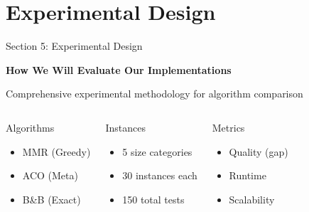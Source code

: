 \documentclass[aspectratio=43,8pt]{beamer}
\begin{document}
\section{Experimental Design}

\begin{frame}{Section 5: Experimental Design}
\begin{center}
{\Large\textcolor{primaryblue}{\textbf{How We Will Evaluate Our Implementations}}}

\vspace{0.5cm}
{\normalsize Comprehensive experimental methodology for algorithm comparison}
\end{center}

\vspace{0.3cm}
\begin{columns}[t]
\begin{block}{Algorithms}
\begin{itemize}
    \item MMR (Greedy)
    \item ACO (Meta)
    \item B\&B (Exact)
\end{itemize}
\end{block}

\begin{alertblock}{Instances}
\begin{itemize}
    \item 5 size categories
    \item 30 instances each
    \item 150 total tests
\end{itemize}
\end{alertblock}

\begin{exampleblock}{Metrics}
\begin{itemize}
    \item Quality (gap)
    \item Runtime
    \item Scalability
\end{itemize}
\end{exampleblock}
\end{columns}
\end{frame}
\end{document}
